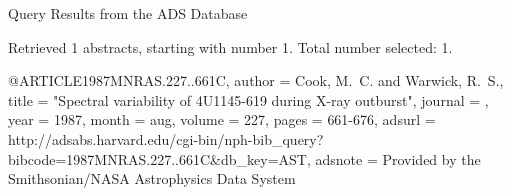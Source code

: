 Query Results from the ADS Database


Retrieved 1 abstracts, starting with number 1.  Total number selected: 1.

@ARTICLE{1987MNRAS.227..661C,
   author = {{Cook}, M.~C. and {Warwick}, R.~S.},
    title = "{Spectral variability of 4U1145-619 during X-ray outburst}",
  journal = {\mnras},
     year = 1987,
    month = aug,
   volume = 227,
    pages = {661-676},
   adsurl = {http://adsabs.harvard.edu/cgi-bin/nph-bib_query?bibcode=1987MNRAS.227..661C&db_key=AST},
  adsnote = {Provided by the Smithsonian/NASA Astrophysics Data System}
}


